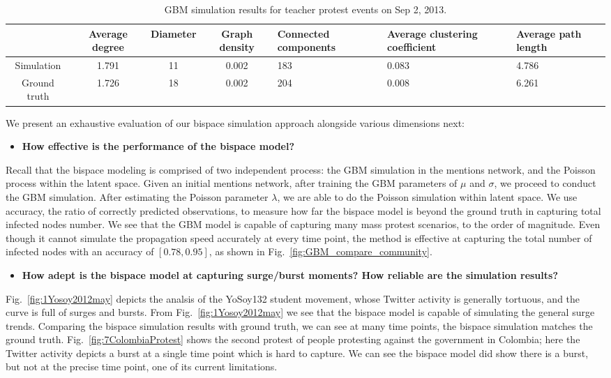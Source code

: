 \begin{table}[!ht]
\tiny
\caption{GBM simulation results for teacher protest events on Sep 2, 2013.}
\centering
\begin{tabular}{|c | c | c | c | p{3cm}<{\centering} | p{2.5cm}<{\centering} | p{2.5cm}<{\centering} |}
\hline
& Average degree & Diameter & Graph density &Connected components& Average clustering coefficient & Average path length  \\ [1ex]
\hline
Simulation& 1.791 & 11&  0.002& 183& 0.083 & 4.786  \\[1ex]
\hline
Ground truth&  1.726 & 18 & 0.002 & 204& 0.008 & 6.261  \\[1ex]
\hline
\end{tabular}
\label{table:simulation_location}
\end{table}


We present an exhaustive evaluation of our bispace simulation approach
alongside various dimensions next:

\begin{itemize}
  \item \textbf{How effective is the performance of the bispace model?}
\end{itemize}
Recall that
the bispace modeling is comprised of
two independent process: the GBM simulation in the mentions network,
and
the Poisson process within the latent space.
Given an initial mentions
network, after training the GBM parameters of $\mu$ and $\sigma$, we proceed to conduct the GBM simulation. After estimating the Poisson parameter $\lambda$, we are able to do the
Poisson simulation within latent space.
We use accuracy, the ratio of correctly predicted observations, to measure how far the bispace model is beyond the ground truth in capturing total infected nodes number. 
We see that the GBM model is capable of capturing many mass protest scenarios, to the order of magnitude.
Even though it cannot simulate the propagation speed accurately
at every time point, the method is effective at capturing the total
number of infected nodes with an accuracy of $[0.78,0.95]$, as shown
in Fig.~\ref{fig:GBM_compare_community}.

\begin{itemize}
  \item \textbf{How adept is the bispace
model at capturing surge/burst moments?
How reliable are the simulation results?}
\end{itemize}
Fig.~\ref{fig:1Yosoy2012may} depicts the analsis
of the YoSoy132 student movement, whose Twitter activity is generally tortuous, and the curve is full of surges and bursts. From
Fig.~\ref{fig:1Yosoy2012may} we see that the bispace model is
capable of simulating the general surge trends. Comparing
the bispace simulation results with ground truth, we can see
at many time points, the bispace simulation matches the ground truth.
Fig.~\ref{fig:7ColombiaProtest} shows the second protest of people protesting
against the government in Colombia; here
the Twitter activity depicts a burst at a single time point which is
hard to capture. We can see the bispace model did show there is
a burst, but not at the precise
time point, one of its current limitations.



